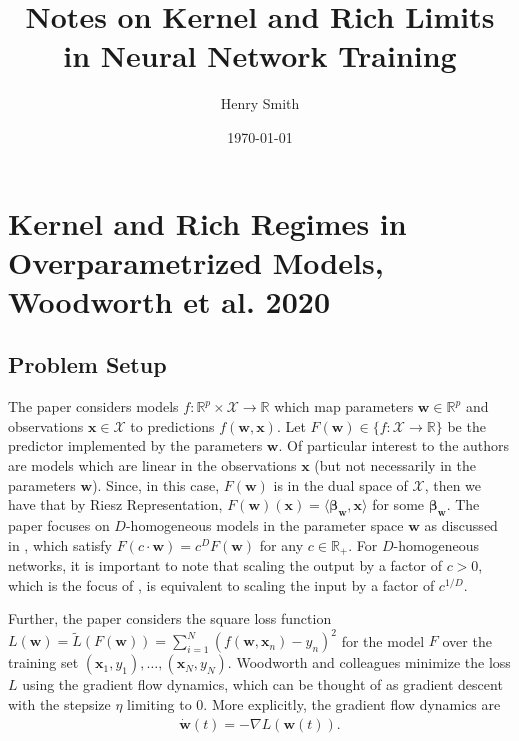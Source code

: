 \documentclass{article}
\title{\textbf{Notes on Kernel and Rich Limits\\ in Neural Network Training}}
\author[]{Henry Smith}
\affil[]{\normalsize Yale University}
\date{\today}
\begin{document}
\maketitle
\section{Kernel and Rich Regimes in Overparametrized Models, Woodworth et al. 2020}

\subsection{Problem Setup}
The paper considers models $f: \mathbb{R}^p \times \mathcal{X} \rightarrow \mathbb{R}$ which map parameters $\boldsymbol{w} \in \mathbb{R}^p$ and observations $\boldsymbol{x} \in \mathcal{X}$ to predictions $f(\boldsymbol{w}, \boldsymbol{x})$. Let $F(\boldsymbol{w}) \in \{f: \mathcal{X} \rightarrow \mathbb{R} \}$ be the predictor implemented by the parameters $\boldsymbol{w}$. Of particular interest to the authors are models which are linear in the observations $\boldsymbol{x}$ (but not necessarily in the parameters $\boldsymbol{w}$). Since, in this case, $F(\boldsymbol{w})$ is in the dual space of $\mathcal{X}$, then we have that by Riesz Representation, $F(\boldsymbol{w})(\boldsymbol{x}) = \langle\boldsymbol{\beta}_{\boldsymbol{w}}, \boldsymbol{x} \rangle$ for some $\boldsymbol{\beta}_{\boldsymbol{w}}$. The paper focuses on $D$-homogeneous models in the parameter space $\boldsymbol{w}$ as discussed in \cite{chizat2018lazy}, which satisfy $F(c \cdot \boldsymbol{w}) = c^D F(\boldsymbol{w})$ for any $c \in \mathbb{R}_+$. For $D$-homogeneous networks, it is important to note that scaling the output by a factor of $c > 0$, which is the focus of \cite{chizat2018lazy}, is equivalent to scaling the input by a factor of $c^{1/D}$. 

Further, the paper considers the square loss function $L(\boldsymbol{w}) = \widetilde{L}(F(\boldsymbol{w})) = \sum_{i=1}^N(f(\boldsymbol{w}, \boldsymbol{x}_n) - y_n)^2$ for the model $F$ over the training set $(\boldsymbol{x}_1, y_1), \ldots, (\boldsymbol{x}_N, y_N).$ Woodworth and colleagues minimize the loss $L$ using the gradient flow dynamics, which can be thought of as gradient descent with the stepsize $\eta$ limiting to 0. More explicitly, the gradient flow dynamics are
\begin{align*}
    \dot{\boldsymbol{w}}(t) = - \nabla L(\boldsymbol{w}(t)).
\end{align*}
\end{document}

